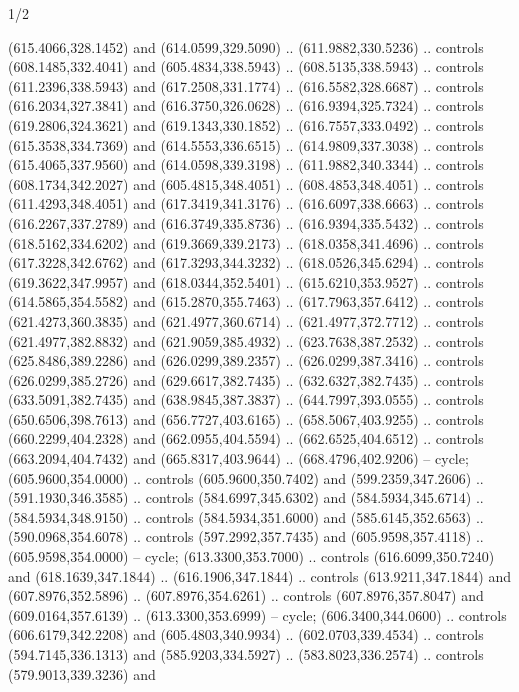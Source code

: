 \begin{flagdescription}{1/2}
\begin{scope}[shift={(2*\flaglength/3-0.25*\rb,0.51333\flagwidth)},scale=0.001715\flagwidth*\stretchfactor]
\begin{scope}[y=-1pt, x=1pt,cm={{1.04354,0.0,0.0,1.01818,(-827,-297)}}]
\begin{scope}[draw=black,line width=0.015\flagwidth]
\begin{scope}[fill=gold]
  (615.4066,328.1452) and (614.0599,329.5090) .. (611.9882,330.5236) .. controls
  (608.1485,332.4041) and (605.4834,338.5943) .. (608.5135,338.5943) .. controls
  (611.2396,338.5943) and (617.2508,331.1774) .. (616.5582,328.6687) .. controls
  (616.2034,327.3841) and (616.3750,326.0628) .. (616.9394,325.7324) .. controls
  (619.2806,324.3621) and (619.1343,330.1852) .. (616.7557,333.0492) .. controls
  (615.3538,334.7369) and (614.5553,336.6515) .. (614.9809,337.3038) .. controls
  (615.4065,337.9560) and (614.0598,339.3198) .. (611.9882,340.3344) .. controls
  (608.1734,342.2027) and (605.4815,348.4051) .. (608.4853,348.4051) .. controls
  (611.4293,348.4051) and (617.3419,341.3176) .. (616.6097,338.6663) .. controls
  (616.2267,337.2789) and (616.3749,335.8736) .. (616.9394,335.5432) .. controls
  (618.5162,334.6202) and (619.3669,339.2173) .. (618.0358,341.4696) .. controls
  (617.3228,342.6762) and (617.3293,344.3232) .. (618.0526,345.6294) .. controls
  (619.3622,347.9957) and (618.0344,352.5401) .. (615.6210,353.9527) .. controls
  (614.5865,354.5582) and (615.2870,355.7463) .. (617.7963,357.6412) .. controls
  (621.4273,360.3835) and (621.4977,360.6714) .. (621.4977,372.7712) .. controls
  (621.4977,382.8832) and (621.9059,385.4932) .. (623.7638,387.2532) .. controls
  (625.8486,389.2286) and (626.0299,389.2357) .. (626.0299,387.3416) .. controls
  (626.0299,385.2726) and (629.6617,382.7435) .. (632.6327,382.7435) .. controls
  (633.5091,382.7435) and (638.9845,387.3837) .. (644.7997,393.0555) .. controls
  (650.6506,398.7613) and (656.7727,403.6165) .. (658.5067,403.9255) .. controls
  (660.2299,404.2328) and (662.0955,404.5594) .. (662.6525,404.6512) .. controls
  (663.2094,404.7432) and (665.8317,403.9644) .. (668.4796,402.9206) -- cycle;
 (605.9600,354.0000) .. controls (605.9600,350.7402) and
  (599.2359,347.2606) .. (591.1930,346.3585) .. controls (584.6997,345.6302) and
  (584.5934,345.6714) .. (584.5934,348.9150) .. controls (584.5934,351.6000) and
  (585.6145,352.6563) .. (590.0968,354.6078) .. controls (597.2992,357.7435) and
  (605.9598,357.4118) .. (605.9598,354.0000) -- cycle;
 (613.3300,353.7000) .. controls (616.6099,350.7240) and
  (618.1639,347.1844) .. (616.1906,347.1844) .. controls (613.9211,347.1844) and
  (607.8976,352.5896) .. (607.8976,354.6261) .. controls (607.8976,357.8047) and
  (609.0164,357.6139) .. (613.3300,353.6999) -- cycle;
 (606.3400,344.0600) .. controls (606.6179,342.2208) and
  (605.4803,340.9934) .. (602.0703,339.4534) .. controls (594.7145,336.1313) and
  (585.9203,334.5927) .. (583.8023,336.2574) .. controls (579.9013,339.3236) and

\end{scope}
\end{scope}
\end{scope}
\end{scope}
\end{flagdescription}
